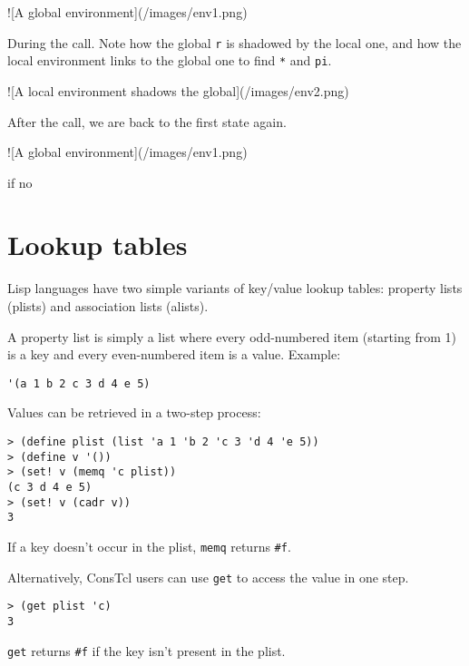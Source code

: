 \documentclass{report}
\begin{document}
![A global environment](/images/env1.png)


During the call. Note how the global \texttt{r} is shadowed by the local one, and how the local environment links to the global one to find \texttt{*} and \texttt{pi}.


![A local environment shadows the global](/images/env2.png)


After the call, we are back to the first state again.


![A global environment](/images/env1.png)


if no {

\section{Lookup tables}
\label{lookup-tables}

Lisp languages have two simple variants of key/value lookup tables: property lists (plists) and association lists (alists).


A property list is simply a list where every odd-numbered item (starting from 1) is a key and every even-numbered item is a value. Example:

\noindent\makebox[\linewidth]{\rule{\linewidth}{0.4pt}}
\begin{lstlisting}
'(a 1 b 2 c 3 d 4 e 5)
\end{lstlisting}
\noindent\makebox[\linewidth]{\rule{\linewidth}{0.4pt}}

Values can be retrieved in a two-step process:

\noindent\makebox[\linewidth]{\rule{\linewidth}{0.4pt}}
\begin{lstlisting}
> (define plist (list 'a 1 'b 2 'c 3 'd 4 'e 5))
> (define v '())
> (set! v (memq 'c plist))
(c 3 d 4 e 5)
> (set! v (cadr v))
3
\end{lstlisting}
\noindent\makebox[\linewidth]{\rule{\linewidth}{0.4pt}}

If a key doesn't occur in the plist, \texttt{memq} returns \texttt{\#f}.


Alternatively, ConsTcl users can use \texttt{get} to access the value in one step.

\noindent\makebox[\linewidth]{\rule{\linewidth}{0.4pt}}
\begin{lstlisting}
> (get plist 'c)
3
\end{lstlisting}
\noindent\makebox[\linewidth]{\rule{\linewidth}{0.4pt}}

\texttt{get} returns \texttt{\#f} if the key isn't present in the plist.


}
\end{document}
